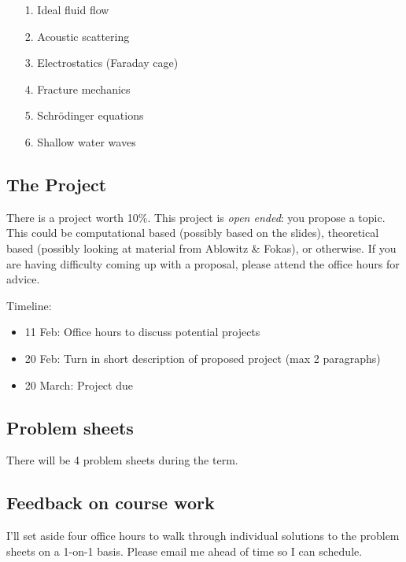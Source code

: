 \documentclass[12pt,a4paper]{article}
\begin{document}
\begin{itemize}
\item[1. ] Ideal fluid flow


\item[2. ] Acoustic scattering


\item[3. ] Electrostatics (Faraday cage)


\item[4. ] Fracture mechanics


\item[5. ] Schrödinger equations


\item[6. ] Shallow water waves

\end{itemize}
\subsection{The Project}
There is a project worth 10\%. This project is \emph{open ended}: you propose a topic. This could be computational based (possibly based on the slides), theoretical based (possibly looking at material from Ablowitz \& Fokas), or otherwise. If you are having difficulty coming up with a proposal, please attend the office hours for advice.

Timeline:

\begin{itemize}
\item 11 Feb: Office hours to discuss potential projects


\item 20 Feb: Turn in short description of proposed project (max 2 paragraphs)


\item 20 March: Project due

\end{itemize}
\subsection{Problem sheets}
There will be 4 problem sheets during the term.

\subsection{Feedback on course work}
I'll set aside four office hours to walk through individual solutions to the problem sheets on a 1-on-1 basis. Please email me ahead of time so I can schedule.
\end{document}

